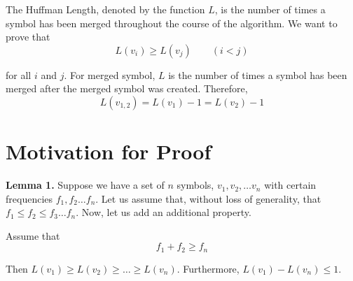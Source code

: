 \documentclass{article}
\begin{document}
The Huffman Length, denoted by the function $L$, is the number of times a symbol has been merged throughout the course of the algorithm. We want to prove that
$$ 
L(v_i) \geq L(v_j) \qquad (i < j)
$$

for all $i$ and $j$. For merged symbol, $L$ is the number of times a symbol has been merged after the merged symbol was created. Therefore, 
$$
L(v_{1,2}) = L(v_{1}) - 1 = L(v_{2}) - 1 
$$

\section{Motivation for Proof}

\textbf{ Lemma 1.} Suppose we have a set of $n$ symbols, $v_1, v_2, \ldots v_n$ with certain frequencies $f_1, f_2 \ldots f_n$. Let us assume that, without loss of generality, that $f_1 \leq f_2 \leq f_3 \ldots f_n$. Now, let us add an additional property.

Assume that
$$
f_1 + f_2 \geq f_n
$$

Then $L(v_1) \geq L(v_2) \geq \ldots \geq L(v_n)$. Furthermore, $L(v_1) - L(v_n) \leq 1$.
\end{document}
